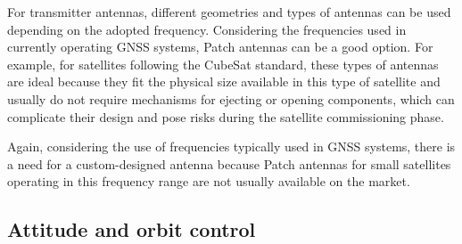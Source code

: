 
For transmitter antennas, different geometries and types of antennas can be used depending on the adopted frequency. Considering the frequencies used in currently operating GNSS systems, Patch antennas can be a good option. For example, for satellites following the CubeSat standard, these types of antennas are ideal because they fit the physical size available in this type of satellite and usually do not require mechanisms for ejecting or opening components, which can complicate their design and pose risks during the satellite commissioning phase.

Again, considering the use of frequencies typically used in GNSS systems, there is a need for a custom-designed antenna because Patch antennas for small satellites operating in this frequency range are not usually available on the market.

\subsection{Attitude and orbit control}



